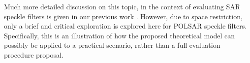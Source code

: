 Much more detailed discussion on this topic, 
  in the context of evaluating SAR speckle filters is given in our previous work \cite{Le_2013_TGRS_SAR_MSE}.
However, due to space restriction, only a brief and critical exploration is explored here for POLSAR speckle filters.
Specifically, this is an illustration of how the proposed theoretical model can possibly be applied to a practical scenario, rather than a full evaluation procedure proposal.


%

